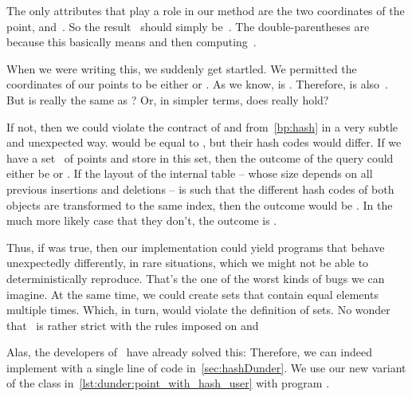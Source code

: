 The only attributes that play a role in our  method are the two coordinates of the point,  and~.
So the result~ should simply be~.
The double-parentheses are because this basically means  and then computing~.%
%
\begin{sloppypar}%
When we were writing this, we suddenly get startled.
We permitted the coordinates of our points to be either  or .
As we know,  is .
Therefore,  is also~.
But is  really the same as ?
Or, in simpler terms, does  really hold?%
\end{sloppypar}%
%
If not, then we could violate the contract of  and  from~\cref{bp:hash} in a very subtle and unexpected way.
 would be equal to , but their hash codes would differ.
If we have a set~ of points and store  in this set, then the outcome of the query  could either be  or .
If the layout of the internal table -- whose size depends on all previous insertions and deletions -- is such that the different hash codes of both objects are transformed to the same index, then the outcome would be .
In the much more likely case that they don't, the outcome is .

Thus, if  was true, then our implementation could yield programs that behave unexpectedly differently, in rare situations, which we might not be able to deterministically reproduce.
That's the one of the worst kinds of bugs we can imagine.
At the same time, we could create sets that contain equal elements multiple times.
Which, in turn, would violate the definition of sets.
No wonder that \python\ is rather strict with the rules imposed on  and 

Alas, the developers of \python\ have already solved this:%
%
%
%
Therefore, we can indeed implement  with a single line of code in~\cref{sec:hashDunder}.
We use our new variant of the  class in~\cref{lst:dunder:point_with_hash_user} with program .

